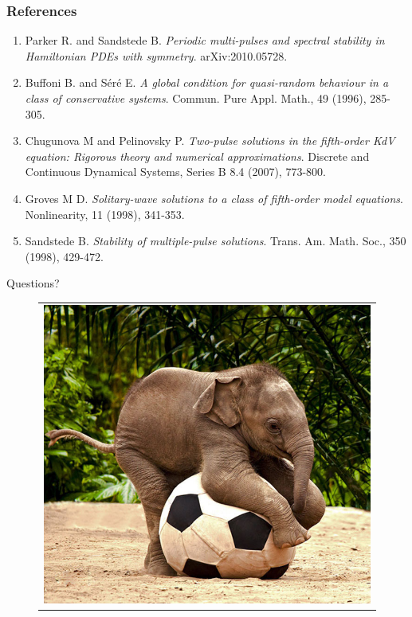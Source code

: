 \documentclass[16pt]{beamer}
\begin{document}
\begin{frame}
	\frametitle{References}
	\fontsize{12}{7.2}\selectfont
	\begin{enumerate}
		\item Parker R. and Sandstede B. \emph{Periodic multi-pulses and spectral stability in Hamiltonian PDEs with symmetry}. arXiv:2010.05728.
		\item Buffoni B. and S\'er\'e E. \emph{A global condition for quasi-random behaviour in a class of conservative systems}. Commun. Pure Appl. Math., 49 (1996), 285-305.
		\item Chugunova M and Pelinovsky P. \emph{Two-pulse solutions in the fifth-order KdV equation: Rigorous theory and numerical approximations}. Discrete and Continuous Dynamical Systems, Series B 8.4 (2007), 773-800.
		\item Groves M D. \emph{Solitary-wave solutions to a class of fifth-order model equations}. Nonlinearity, 11 (1998), 341-353.
		\item Sandstede B. \emph{Stability of multiple-pulse solutions}. Trans. Am. Math. Soc., 350 (1998), 429-472.
	\end{enumerate}
\end{frame}

\begin{frame}
	\fontsize{16}{7.2}\selectfont
\begin{center}
		Questions?

		\begin{figure}[H]
		\begin{tabular}{c}
		\includegraphics[width=0.65\linewidth]{images/babyelephant4.jpg} 
		\end{tabular}
		\end{figure}

	\end{center}
\end{frame}
\end{document}
